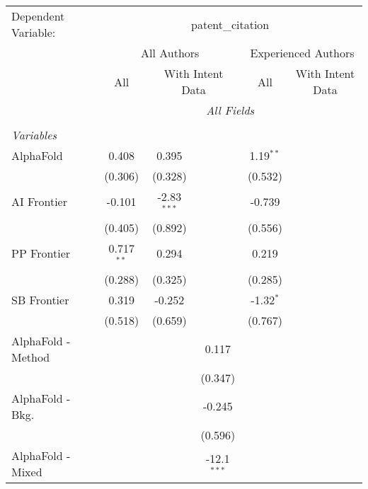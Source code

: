 \begingroup
\centering
\begin{tabular}{lcccccc}
   \tabularnewline \midrule \midrule
   Dependent Variable: & \multicolumn{6}{c}{patent\_citation}\\
 & \multicolumn{3}{c}{All Authors} & \multicolumn{3}{c}{Experienced Authors} \\
\cmidrule(lr){2-4} \cmidrule(lr){5-7}
 & \multicolumn{1}{c}{All} & \multicolumn{2}{c}{With Intent Data} & \multicolumn{1}{c}{All} & \multicolumn{2}{c}{With Intent Data} \\
\cmidrule(lr){2-2} \cmidrule(lr){3-4} \cmidrule(lr){5-5} \cmidrule(lr){6-7}
 & \multicolumn{6}{c}{\textit{All Fields}} \\ \\
   \emph{Variables}\\
   AlphaFold            & 0.408        & 0.395         &               & 1.19$^{**}$ &        &   \\   
                        & (0.306)      & (0.328)       &               & (0.532)     &        &   \\   
   AI Frontier          & -0.101       & -2.83$^{***}$ &               & -0.739      &        &   \\   
                        & (0.405)      & (0.892)       &               & (0.556)     &        &   \\   
   PP Frontier          & 0.717$^{**}$ & 0.294         &               & 0.219       &        &   \\   
                        & (0.288)      & (0.325)       &               & (0.285)     &        &   \\   
   SB Frontier          & 0.319        & -0.252        &               & -1.32$^{*}$ &        &   \\   
                        & (0.518)      & (0.659)       &               & (0.767)     &        &   \\   
   AlphaFold - Method   &              &               & 0.117         &             &        &   \\   
                        &              &               & (0.347)       &             &        &   \\   
   AlphaFold - Bkg.     &              &               & -0.245        &             &        &   \\   
                        &              &               & (0.596)       &             &        &   \\   
   AlphaFold - Mixed    &              &               & -12.1$^{***}$ &             &        &   \\   

\end{tabular}
